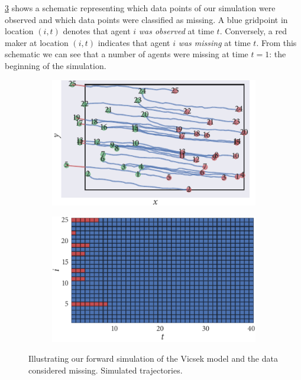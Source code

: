 \cref{subfig:beg_missing} shows a schematic representing which data points of
our simulation were observed and which data points were classified as missing.
A blue gridpoint in location $(i, t)$ denotes that agent $i$ \emph{was
observed} at time $t$. Conversely, a red maker at location $(i, t)$ indicates
that agent $i$ \emph{was missing} at time $t$. From this schematic we can
see that a number of agents were missing at time $t=1$: the beginning of the
simulation.

\begin{figure}[tbp]
  \begin{subfigure}[b]{0.5\textwidth}
    \includegraphics{beg/data.pdf}
    \caption{}
    \label{subfig:beg_data}
  \end{subfigure}%
  \begin{subfigure}[b]{0.5\textwidth}
    \includegraphics{beg/missing_array.pdf}
    \caption{}
    \label{subfig:beg_missing}
  \end{subfigure}
  \caption{Illustrating our forward simulation of the Vicsek model and the
    data considered missing.  Simulated trajectories.
}
\end{figure}
